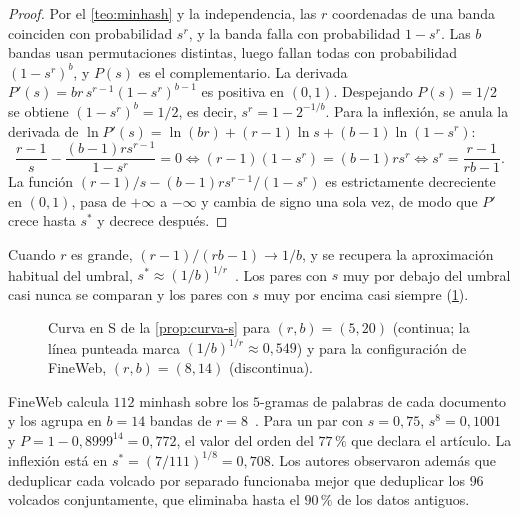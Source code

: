 \begin{proof}
Por el \cref{teo:minhash} y la independencia, las $r$ coordenadas de una banda coinciden con probabilidad $s^{r}$, y la banda falla con probabilidad $1-s^{r}$. Las $b$ bandas usan permutaciones distintas, luego fallan todas con probabilidad $(1-s^{r})^{b}$, y $P(s)$ es el complementario. La derivada $P'(s)=br\,s^{r-1}(1-s^{r})^{b-1}$ es positiva en $(0,1)$. Despejando $P(s)=1/2$ se obtiene $(1-s^{r})^{b}=1/2$, es decir, $s^{r}=1-2^{-1/b}$. Para la inflexión, se anula la derivada de $\ln P'(s)=\ln(br)+(r-1)\ln s+(b-1)\ln(1-s^{r})$:
\[
\frac{r-1}{s}-\frac{(b-1)rs^{r-1}}{1-s^{r}}=0\iff(r-1)(1-s^{r})=(b-1)rs^{r}\iff s^{r}=\frac{r-1}{rb-1}.
\]
La función $(r-1)/s-(b-1)rs^{r-1}/(1-s^{r})$ es estrictamente decreciente en $(0,1)$, pasa de $+\infty$ a $-\infty$ y cambia de signo una sola vez, de modo que $P'$ crece hasta $s^{*}$ y decrece después.
\end{proof}

Cuando $r$ es grande, $(r-1)/(rb-1)\to 1/b$, y se recupera la aproximación habitual del umbral, $s^{*}\approx(1/b)^{1/r}$~\cite[§3.4]{mmds}. Los pares con $s$ muy por debajo del umbral casi nunca se comparan y los pares con $s$ muy por encima casi siempre (\cref{fig:curva-s}).

\begin{figure}[h]
\centering
{}
\caption{Curva en S de la \cref{prop:curva-s} para $(r,b)=(5,20)$ (continua; la línea punteada marca $(1/b)^{1/r}\approx 0{,}549$) y para la configuración de FineWeb, $(r,b)=(8,14)$ (discontinua).}
\label{fig:curva-s}
\end{figure}

\begin{ejemplo}[FineWeb]\label{ej:fineweb}
FineWeb calcula $112$ minhash sobre los $5$-gramas de palabras de cada documento y los agrupa en $b=14$ bandas de $r=8$~\cite[§3.4]{fineweb}. Para un par con $s=0{,}75$, $s^{8}=0{,}1001$ y $P=1-0{,}8999^{14}=0{,}772$, el valor del orden del $77\,\%$ que declara el artículo. La inflexión está en $s^{*}=(7/111)^{1/8}=0{,}708$. Los autores observaron además que deduplicar cada volcado por separado funcionaba mejor que deduplicar los $96$ volcados conjuntamente, que eliminaba hasta el $90\,\%$ de los datos antiguos.
\end{ejemplo}

